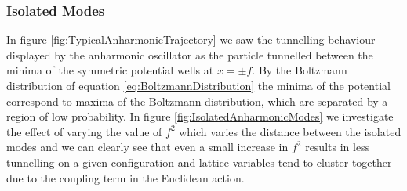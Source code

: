 \documentclass[12pt]{article}
\begin{document}
            \subsubsection{Isolated Modes}
                In figure \ref{fig:TypicalAnharmonicTrajectory} we saw the tunnelling behaviour displayed by the anharmonic oscillator as the particle tunnelled between the minima of the symmetric potential wells at $x=\pm f$. By the Boltzmann distribution of equation \ref{eq:BoltzmannDistribution} the minima of the potential correspond to maxima of the Boltzmann distribution, which are separated by a region of low probability. In figure \ref{fig:IsolatedAnharmonicModes} we investigate the effect of varying the value of $f^2$ which varies the distance between the isolated modes and we can clearly see that even a small increase in $f^2$ results in less tunnelling on a given configuration and lattice variables tend to cluster together due to the coupling term in the Euclidean action.
\end{document}
